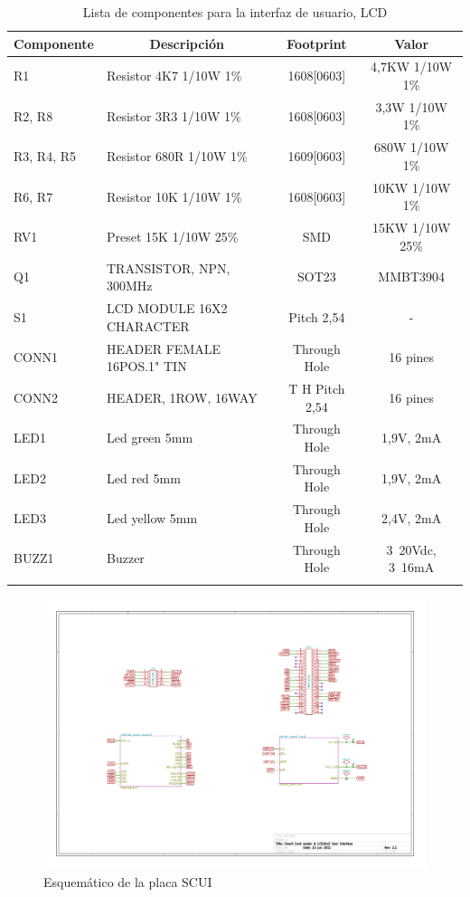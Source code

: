 \newpage
\begin{longtable}{|l|l|c|c|}
\hline
\multicolumn{1}{|c|}{\textbf{Componente}} & \multicolumn{1}{c|}{\textbf{Descripción}} & \textbf{ Footprint} & \textbf{Valor} \\ \hline
R1 & Resistor 4K7    1/10W     1\% & 1608[0603] & 4,7KW  1/10W   1\% \\ \hline
R2, R8 & Resistor 3R3    1/10W     1\% & 1608[0603] & 3,3W    1/10W   1\% \\ \hline
R3, R4, R5 & Resistor 680R  1/10W     1\% & 1609[0603] & 680W   1/10W   1\% \\ \hline
R6, R7 & Resistor 10K    1/10W     1\% & 1608[0603] & 10KW  1/10W   1\% \\ \hline
RV1 & Preset 15K        1/10W  25\% & SMD & 15KW   1/10W  25\% \\ \hline
Q1 & TRANSISTOR, NPN, 300MHz & SOT23 & MMBT3904 \\ \hline
S1 & LCD MODULE 16X2 CHARACTER & Pitch 2,54 & - \\ \hline
CONN1 & HEADER FEMALE 16POS.1" TIN & Through Hole & 16 pines \\ \hline
CONN2 & HEADER, 1ROW, 16WAY & T H Pitch 2,54 & 16 pines \\ \hline
LED1 & Led green 5mm & Through Hole & 1,9V,  2mA \\ \hline
LED2 & Led red 5mm & Through Hole & 1,9V,  2mA \\ \hline
LED3 & Led yellow 5mm & Through Hole & 2,4V,  2mA \\ \hline
BUZZ1 & Buzzer & Through Hole & 3~20Vdc, 3~16mA \\ \hline
\caption{Lista de componentes para la interfaz de usuario, LCD}
\label{}
\end{longtable}

\begin{figure}[H]
\centering
  \begin{center}
   \includegraphics[angle=90]{Imagenes/scui.jpg}
  \end{center}
  \caption{Esquemático de la placa SCUI}\label{Fig:SCUI} 
\end{figure}

